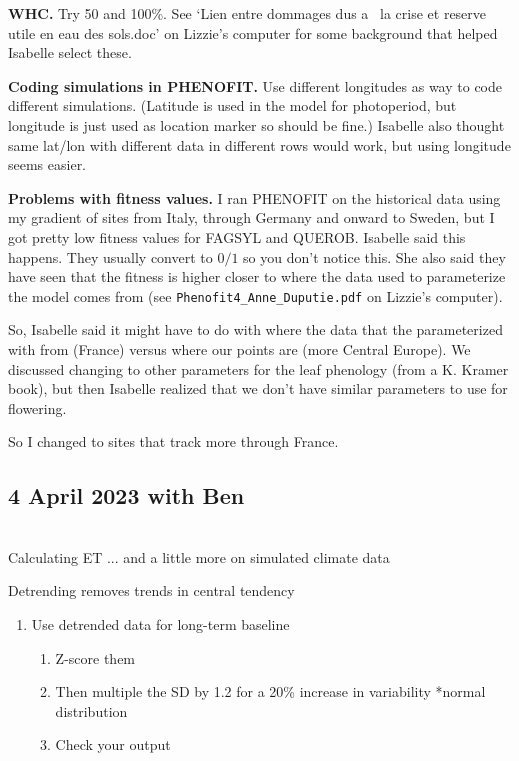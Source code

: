 \documentclass[11pt,letter]{article}
\begin{document}
{\bf WHC.} Try 50 and 100\%. See `Lien entre dommages dus a  la crise et reserve utile en eau des sols.doc' on Lizzie's computer for some background that helped Isabelle select these. 

{\bf Coding simulations in PHENOFIT.} Use different longitudes as way to code different simulations. (Latitude is used in the model for photoperiod, but longitude is just used as location marker so should be fine.) Isabelle also thought same lat/lon with different data in different rows would work, but using longitude seems easier. 

{\bf Problems with fitness values.} I ran PHENOFIT on the historical data using my gradient of sites from Italy, through Germany and onward to Sweden, but I got pretty low fitness values for FAGSYL and QUEROB. Isabelle said this happens. They usually convert to $0/1$ so you don't notice this. She also said they have seen that the fitness is higher closer to where the data used to parameterize the model comes from  (see \verb|Phenofit4_Anne_Duputie.pdf| on Lizzie's computer). 

So, Isabelle said it might have to do with where the data that the parameterized with from (France) versus where our points are (more Central Europe). We discussed changing to other parameters for the leaf phenology (from a K. Kramer book), but then Isabelle realized that we don't have similar parameters to use for flowering. 

So I changed to sites that track more through France. \\


\subsection{4 April 2023 with Ben}\\

Calculating ET ... and a little more on simulated climate data 

Detrending removes trends in central tendency 
\begin{enumerate}
\item Use detrended data for long-term baseline
\begin{enumerate}
\item Z-score them
\item Then multiple the SD by 1.2 for a 20\% increase in variability *normal distribution 
\item Check your output 
\end{enumerate}
\end{enumerate}
\end{document}
